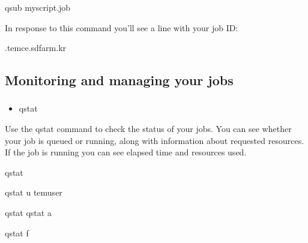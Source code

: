 \documentclass[letterpaper,10pt,english]{sphinxmanual}
\begin{document}
\begin{sphinxVerbatim}[commandchars=\\\{\}]
\PYGZdl{}\PYGZgt{} qsub myscript.job
\end{sphinxVerbatim}

In response to this command you’ll see a line with your job ID:

\begin{sphinxVerbatim}[commandchars=\\\{\}]
.tem\PYGZhy{}ce.sdfarm.kr
\end{sphinxVerbatim}


\subsection{Monitoring and managing your jobs}
\label{\detokenize{guide:monitoring-and-managing-your-jobs}}

\subsubsection{}
\label{\detokenize{guide:status-of-queued-jobs}}\begin{itemize}
\item {} 
qstat

\end{itemize}

Use the qstat command to check the status of your jobs. You can see whether your job is queued or running, along with information about requested resources. If the job is running you can see elapsed time and resources used.

\begin{sphinxVerbatim}[commandchars=\\\{\}]
\PYGZdl{}\PYGZgt{} qstat

\PYGZdl{}\PYGZgt{} qstat \PYGZhy{}u tem\PYGZus{}user

\PYGZdl{}\PYGZgt{} qstat 
\PYGZdl{}\PYGZgt{} qstat \PYGZhy{}a 

\PYGZdl{}\PYGZgt{} qstat \PYGZhy{}f 
\end{sphinxVerbatim}
\end{document}
